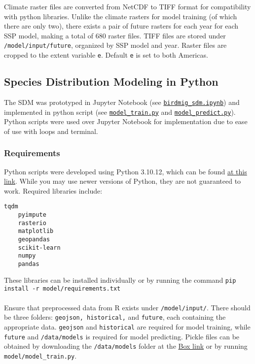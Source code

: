\documentclass{article}
\begin{document}
Climate raster files are converted from NetCDF to TIFF format for compatibility with python libraries.
Unlike the climate rasters for model training (of which there are only two), there exists a pair of future rasters for each year for each SSP model, making a total of 680 raster files. 
TIFF files are stored under \texttt{/model/input/future}, organized by SSP model and year.
Raster files are cropped to the extent variable \texttt{e}. Default \texttt{e} is set to both Americas.

\subsection{Species Distribution Modeling in Python}

The SDM was prototyped in Jupyter Notebook (see \texttt{\href{run:../model/birdmig\_sdm.ipynb}{birdmig\_sdm.ipynb}}) and implemented in python script (see \texttt{\href{run:../model/model\_train.py}{model\_train.py}} and \texttt{\href{run:../model/model\_predict.py}{model\_predict.py}}). Python scripts were used over Jupyter Notebook for implementation due to ease of use with loops and terminal.

\subsubsection*{Requirements}
Python scripts were developed using Python 3.10.12, which can be found \href{https://www.python.org/downloads/}{at this link}. While you may use newer versions of Python, they are not guaranteed to work. Required libraries include: 
\begin{Verbatim}[tabsize=4]
	tqdm
	pyimpute
	rasterio
	matplotlib
	geopandas
	scikit-learn
	numpy
	pandas
\end{Verbatim}

\noindent These libraries can be installed individually or by running the command \texttt{pip install -r model/requirements.txt}
\\\\
Ensure that preprocessed data from R exists under \texttt{/model/input/}. There should be three folders: \texttt{geojson, historical,} and \texttt{future}, each containing the appropriate data. \texttt{geojson} and \texttt{historical} are required for model training, while \texttt{future} and \texttt{/data/models} is required for model predicting. Pickle files can be obtained by downloading the \texttt{/data/models} folder at the \href{https://ucdavis.box.com/s/l5iky1y6z526r6ewifvtr6c4ccp5jsjz}{Box link} or by running \texttt{model/model\_train.py}.
\end{document}
